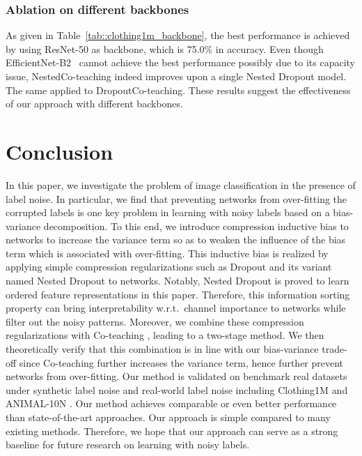 \documentclass[journal]{IEEEtran}
\begin{document}
\subsubsection{Ablation on different backbones}
As given in Table~\ref{tab::clothing1m_backbone}, the best performance is achieved by using ResNet-50 as backbone, which is 75.0\% in accuracy.
Even though EfficientNet-B2~\cite{tan2019efficientnet} cannot achieve the best performance possibly due to its capacity issue, NestedCo-teaching indeed improves upon a single Nested Dropout model.
The same applied to DropoutCo-teaching.
These results suggest the effectiveness of our approach with different backbones.


\section{Conclusion} 
\label{sec::conclusion}
In this paper, we investigate the problem of image classification in the presence of label noise.
In particular, we find that preventing networks from over-fitting the corrupted labels is one key problem in learning with noisy labels based on a bias-variance decomposition.
To this end, we introduce compression inductive bias to networks to increase the variance term so as to weaken the influence of the bias term which is associated with over-fitting.
This inductive bias is realized by applying simple compression regularizations such as Dropout \cite{srivastava2014dropout} and its variant named Nested Dropout \cite{rippel2014learning} to networks.
Notably, Nested Dropout is proved to learn ordered feature representations in this paper.
Therefore, this information sorting property can bring interpretability w.r.t.~channel importance to networks while filter out the noisy patterns.
Moreover, we combine these compression regularizations with Co-teaching \cite{han2018co}, leading to a two-stage method.
We then theoretically verify that this combination is in line with our bias-variance trade-off since Co-teaching further increases the variance term, hence further prevent networks from over-fitting.
Our method is validated on benchmark real datasets under synthetic label noise and real-world label noise including Clothing1M \cite{xiao2015learning} and ANIMAL-10N \cite{song2019selfie}.
Our method achieves comparable or even better performance than state-of-the-art approaches.
Our approach is simple compared to many existing methods.  
Therefore, we hope that our approach can serve as a strong baseline for future research on learning with noisy labels.
\end{document}
